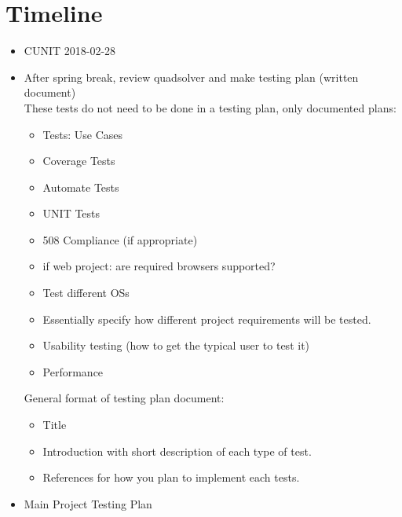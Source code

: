 \documentclass{report}
\begin{document}
\section{Timeline}
\begin{itemize}
\item CUNIT 2018-02-28
\item After spring break, review quadsolver and make testing plan (written document)\\
These tests do not need to be done in a testing plan, only documented plans:
	\begin{itemize}
	\item Tests: Use Cases
	\item Coverage Tests
	\item Automate Tests
	\item UNIT Tests
	\item 508 Compliance (if appropriate)
	\item if web project: are required browsers supported?
	\item Test different OSs
	\item Essentially specify how different project requirements will be tested.
	\item Usability testing (how to get the typical user to test it)
	\item Performance	
	\end{itemize}
	General format of testing plan document:
	\begin{itemize}
	\item Title
	\item Introduction with short description of each type of test.
	\item References for how you plan to implement each tests.
	\end{itemize}
\item Main Project Testing Plan
\end{itemize}
\end{document}
